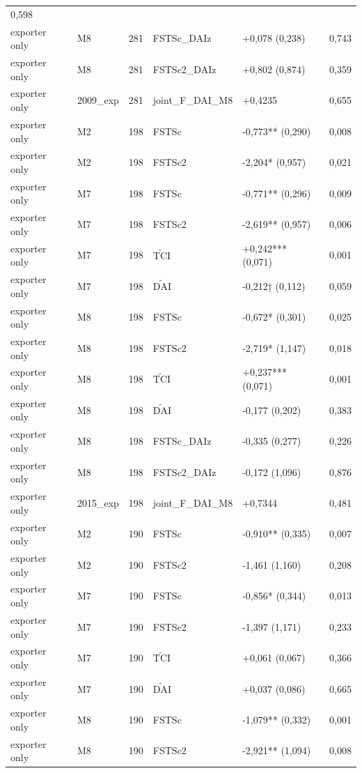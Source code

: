 \documentclass[12pt,a4paper]{article}
\begin{document}
\begin{longtable}[]{@{}llllll@{}}
0,598 \\
exporter only & M8 & 281 & FSTSc\_DAIz & +0,078 (0,238) & 0,743 \\
exporter only & M8 & 281 & FSTSc2\_DAIz & +0,802 (0,874) & 0,359 \\
exporter only & 2009\_exp & 281 & joint\_F\_DAI\_M8 & +0,4235 & 0,655 \\
exporter only & M2 & 198 & FSTSc & -0,773** (0,290) & 0,008 \\
exporter only & M2 & 198 & FSTSc2 & -2,204* (0,957) & 0,021 \\
exporter only & M7 & 198 & FSTSc & -0,771** (0,296) & 0,009 \\
exporter only & M7 & 198 & FSTSc2 & -2,619** (0,957) & 0,006 \\
exporter only & M7 & 198 & \(\tilde{\mathrm{TCI}}\) & +0,242*** (0,071)
& 0,001 \\
exporter only & M7 & 198 & \(\tilde{\mathrm{DAI}}\) & -0,212† (0,112) &
0,059 \\
exporter only & M8 & 198 & FSTSc & -0,672* (0,301) & 0,025 \\
exporter only & M8 & 198 & FSTSc2 & -2,719* (1,147) & 0,018 \\
exporter only & M8 & 198 & \(\tilde{\mathrm{TCI}}\) & +0,237*** (0,071)
& 0,001 \\
exporter only & M8 & 198 & \(\tilde{\mathrm{DAI}}\) & -0,177 (0,202) &
0,383 \\
exporter only & M8 & 198 & FSTSc\_DAIz & -0,335 (0,277) & 0,226 \\
exporter only & M8 & 198 & FSTSc2\_DAIz & -0,172 (1,096) & 0,876 \\
exporter only & 2015\_exp & 198 & joint\_F\_DAI\_M8 & +0,7344 & 0,481 \\
exporter only & M2 & 190 & FSTSc & -0,910** (0,335) & 0,007 \\
exporter only & M2 & 190 & FSTSc2 & -1,461 (1,160) & 0,208 \\
exporter only & M7 & 190 & FSTSc & -0,856* (0,344) & 0,013 \\
exporter only & M7 & 190 & FSTSc2 & -1,397 (1,171) & 0,233 \\
exporter only & M7 & 190 & \(\tilde{\mathrm{TCI}}\) & +0,061 (0,067) &
0,366 \\
exporter only & M7 & 190 & \(\tilde{\mathrm{DAI}}\) & +0,037 (0,086) &
0,665 \\
exporter only & M8 & 190 & FSTSc & -1,079** (0,332) & 0,001 \\
exporter only & M8 & 190 & FSTSc2 & -2,921** (1,094) & 0,008 \\

\end{longtable}
\end{document}
